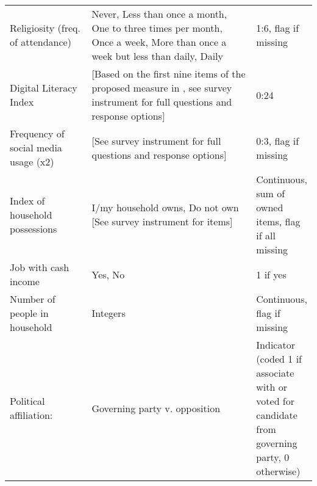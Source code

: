 \begin{table}[H]
\begin{adjustbox}{totalheight=.9\baselineskip, max width = \textwidth}
\begin{tabular}{p{0.3\linewidth}p{0.7\linewidth}p{0.25\linewidth}}
Religiosity (freq. of attendance)                   & Never, Less than once a month, One to three times per month, Once a week, More than once a week but less than daily, Daily                                                                                                          & 1:6, flag if missing                                                                           \\
Digital Literacy Index                              & {[}Based on the first nine items of the proposed measure in \cite{guessetal2020digital}, see survey instrument for full questions and response options{]}                                                                                         & 0:24                                                                                           \\
Frequency of social media usage (x2)                & {[}See survey instrument for full questions and response options{]}                                                                                                                                                                 & 0:3, flag if missing                                                                           \\
Index of household possessions                      & I/my household owns, Do not own {[}See survey instrument for items{]}                                                                                                                                                               & Continuous, sum of owned items, flag if all missing                                            \\
Job with cash income                                & Yes, No                                                                                                                                                                                                                             & 1 if yes                                                                                       \\
Number of people in household                       & Integers                                                                                                                                                                                                                            & Continuous, flag if missing                                                                    \\
Political affiliation:                              & Governing party v. opposition                                                                                                                                                                                                       & Indicator (coded 1 if associate with or voted for candidate from governing party, 0 otherwise) \\

\end{tabular}
\end{adjustbox}
\end{table}
